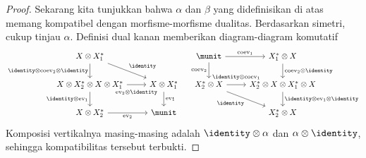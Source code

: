 \begin{proof}
	Sekarang kita tunjukkan bahwa $\alpha$ dan $\beta$ yang didefinisikan di atas
	memang kompatibel dengan morfisme-morfisme dualitas. Berdasarkan simetri,
	cukup tinjau $\alpha$. Definisi dual kanan memberikan diagram-diagram
	komutatif
	\[\begin{tikzcd}
		X \otimes X_1^* \arrow[rd, "{\identity}"] \arrow[d, "{\identity \otimes \mathrm{coev}_2 \otimes \identity}"'] & \\
		X \otimes X_2^* \otimes X \otimes X_1^* \arrow[r, "{\mathrm{ev}_2 \otimes \identity}"' inner sep=0.6em] \arrow[d, "{\identity \otimes \mathrm{ev}_1}"'] & X \otimes X_1^* \arrow[d, "{\mathrm{ev}_1}"] \\
		X \otimes X_2^* \arrow[r, "{\mathrm{ev}_2}"'] & \munit
	\end{tikzcd} \quad \begin{tikzcd}
		\munit \arrow[r, "{\mathrm{coev}_1}"] \arrow[d, "{\mathrm{coev}_2}"'] & X_1^* \otimes X \arrow[d, "{\mathrm{coev}_2 \otimes \identity}"] \\
		X_2^* \otimes X \arrow[r, "{\identity \otimes \mathrm{coev}_1}" inner sep=0.6em] \arrow[rd, "{\identity}"'] & X_2^* \otimes X \otimes X_1^* \otimes X \arrow[d, "{\identity \otimes \mathrm{ev}_1 \otimes \identity}"] \\
		& X_2^* \otimes X
	\end{tikzcd}\]
	Komposisi vertikalnya masing-masing adalah
	$\identity\otimes\alpha$ dan $\alpha\otimes\identity$, sehingga
	kompatibilitas tersebut terbukti.


\end{proof}
